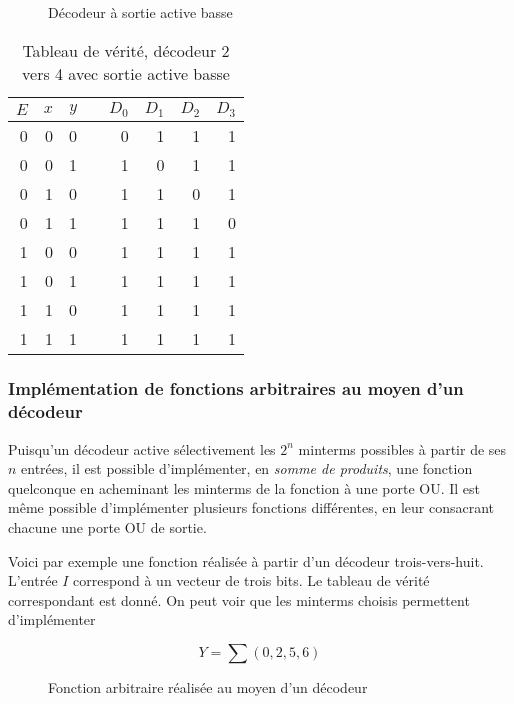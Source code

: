 \documentclass[11pt]{article}
\begin{document}
\begin{figure}[htbp]
\centering

\caption{\label{fig:orgf7f8f26}Décodeur à sortie active basse}
\end{figure}


\begin{table}[htbp]
\caption{\label{tab:org9c0dc50}Tableau de vérité, décodeur 2 vers 4 avec sortie active basse}
\centering
\begin{tabular}{rrrlrrrr}
\(E\) & \(x\) & \(y\) &  & \(D_0\) & \(D_1\) & \(D_2\) & \(D_3\)\\[0pt]
\hline
0 & 0 & 0 &  & 0 & 1 & 1 & 1\\[0pt]
0 & 0 & 1 &  & 1 & 0 & 1 & 1\\[0pt]
0 & 1 & 0 &  & 1 & 1 & 0 & 1\\[0pt]
0 & 1 & 1 &  & 1 & 1 & 1 & 0\\[0pt]
1 & 0 & 0 &  & 1 & 1 & 1 & 1\\[0pt]
1 & 0 & 1 &  & 1 & 1 & 1 & 1\\[0pt]
1 & 1 & 0 &  & 1 & 1 & 1 & 1\\[0pt]
1 & 1 & 1 &  & 1 & 1 & 1 & 1\\[0pt]
\end{tabular}
\end{table}


\subsubsection{Implémentation de fonctions arbitraires au moyen d'un décodeur}
\label{sec:orgd3fb7c6}

Puisqu'un décodeur active sélectivement les \(2^n\) minterms possibles
à partir de ses \(n\) entrées, il est possible d'implémenter, en \emph{somme
de produits}, une fonction quelconque en acheminant les minterms de la
fonction à une porte OU. Il est même possible d'implémenter plusieurs
fonctions différentes, en leur consacrant chacune une porte OU de
sortie.

Voici par exemple une fonction réalisée à partir d'un décodeur
trois-vers-huit. L'entrée \(I\) correspond à un vecteur de trois bits. Le
tableau de vérité correspondant est donné. On peut voir que les
minterms choisis permettent d'implémenter

$$ Y = \sum(0,2,5,6)$$

\begin{figure}[htbp]
\centering

\caption{\label{fig:org8f2e2bd}Fonction arbitraire réalisée au moyen d'un décodeur}
\end{figure}
\end{document}
